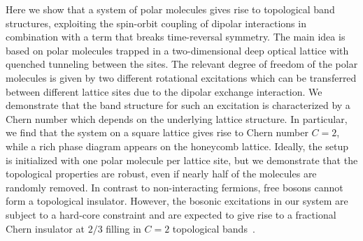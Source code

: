 

Here we show that a system of polar molecules gives rise to topological band structures, exploiting the spin-orbit coupling of dipolar interactions in combination with a term that breaks time-reversal symmetry.
The main idea is based on polar molecules trapped in a two-dimensional deep optical lattice with quenched tunneling between the sites.
The relevant degree of freedom of the polar molecules is given by two different rotational excitations which can be transferred between different lattice sites due to the dipolar exchange interaction.
We demonstrate that the band structure for such an excitation is characterized by a Chern number which depends on the underlying lattice structure.
In particular, we find that the system on a square lattice gives rise to Chern number $C=2$, while a rich phase diagram appears on the honeycomb lattice. %
Ideally, the setup is initialized with one polar molecule per lattice site, but we demonstrate that the topological properties are robust, even if nearly half of the molecules are randomly removed.
In contrast to non-interacting fermions, free bosons cannot form a topological insulator. However,
the bosonic excitations in our system are subject to a hard-core constraint and are expected to give rise to a fractional Chern insulator at $2/3$ filling in $C=2$ topological bands~\cite{Moller2009,Wang2012a,Sterdyniak2015}.

